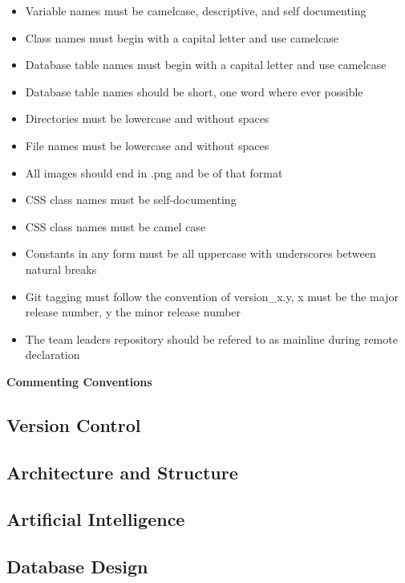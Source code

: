 \documentclass[12pt]{IEEEtran}
\begin{document}
	\begin{itemize}
		\item Variable names must be camelcase, descriptive, and self documenting
		\item Class names must begin with a capital letter and use camelcase 
		\item Database table names must begin with a capital letter and use camelcase
		\item Database table names should be short, one word where ever possible
		\item Directories must be lowercase and without spaces
		\item File names must be lowercase and without spaces
		\item All images should end in .png and be of that format
		\item CSS class names must be self-documenting
		\item CSS class names must be camel case
		\item Constants in any form must be all uppercase with underscores between natural breaks
		\item Git tagging must follow the convention of version\_x.y, x must be the major release number, y the minor release number
		\item The team leaders repository should be refered to as mainline during remote declaration
	\end{itemize}

	\bfseries Commenting Conventions \mdseries

	



\subsection{Version Control}
\label{subsec:git}

\subsection{Architecture and Structure}
\label{subsec:arch}

\subsection{Artificial Intelligence}
\label{subsec:ai}

\subsection{Database Design}
\label{subsec:dbdesign}
\end{document}
